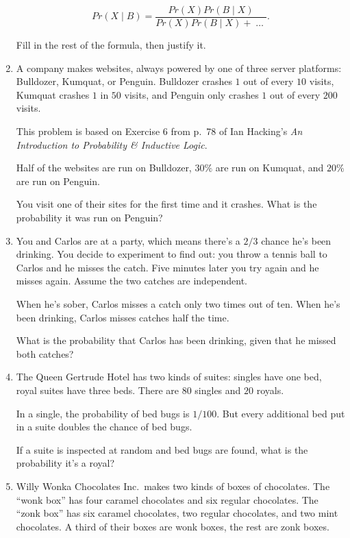 \documentclass[justified]{tufte-book}
\newcommand{\given}{\mid}
\newcommand{\p}{Pr}
\theoremstyle{definition}
\theoremstyle{definition}
\theoremstyle{definition}
\theoremstyle{remark}
\begin{document}
\begin{enumerate}
  \[ \p(X \given B) = \frac{\p(X)\p(B \given X)}{\p(X)\p(B \given X) + \;\ldots\;}.\]

  Fill in the rest of the formula, then justify it.
\item
  A company makes websites, always powered by one of three server platforms: Bulldozer, Kumquat, or Penguin. Bulldozer crashes \(1\) out of every \(10\) visits, Kumquat crashes \(1\) in \(50\) visits, and Penguin only crashes \(1\) out of every \(200\) visits.

  \begin{marginfigure}
  This problem is based on Exercise 6 from p.~78 of Ian Hacking's \emph{An
  Introduction to Probability \& Inductive Logic}.
  \end{marginfigure}

  Half of the websites are run on Bulldozer, \(30\%\) are run on Kumquat, and \(20\%\) are run on Penguin.

  You visit one of their sites for the first time and it crashes. What is the probability it was run on Penguin?
\item
  You and Carlos are at a party, which means there's a \(2/3\) chance he's been drinking. You decide to experiment to find out: you throw a tennis ball to Carlos and he misses the catch. Five minutes later you try again and he misses again. Assume the two catches are independent.

  When he's sober, Carlos misses a catch only two times out of ten. When he's been drinking, Carlos misses catches half the time.

  What is the probability that Carlos has been drinking, given that he missed both catches?
\item
  The Queen Gertrude Hotel has two kinds of suites: singles have one bed, royal suites have three beds. There are \(80\) singles and \(20\) royals.

  In a single, the probability of bed bugs is \(1/100\). But every additional bed put in a suite doubles the chance of bed bugs.

  If a suite is inspected at random and bed bugs are found, what is the probability it's a royal?
\item
  Willy Wonka Chocolates Inc.~makes two kinds of boxes of chocolates. The ``wonk box'' has four caramel chocolates and six regular chocolates. The ``zonk box'' has six caramel chocolates, two regular chocolates, and two mint chocolates. A third of their boxes are wonk boxes, the rest are zonk boxes.


\end{enumerate}
\end{document}
